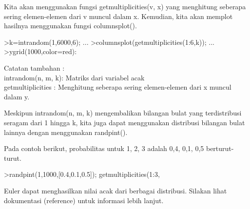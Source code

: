 \documentclass[12pt,arial,letterpaper]{book}
\begin{document}
\begin{eulercomment}
\begin{eulercomment}
\begin{eulercomment}
\begin{eulercomment}
\begin{eulercomment}
\begin{eulercomment}
\begin{eulercomment}
\begin{eulercomment}
\begin{eulercomment}
\begin{eulercomment}
\begin{eulercomment}
\begin{eulercomment}
\begin{eulercomment}
\begin{eulercomment}
\begin{eulercomment}
\begin{eulercomment}
\begin{eulercomment}
\begin{eulercomment}
\begin{eulercomment}
\begin{eulercomment}
\begin{eulercomment}
\begin{eulercomment}
\begin{eulercomment}
\begin{eulercomment}
\begin{eulercomment}
\begin{eulercomment}
\begin{eulercomment}
\begin{eulercomment}
\begin{eulercomment}
\begin{eulercomment}
\begin{eulercomment}
\begin{eulercomment}
\begin{eulercomment}
Kita akan menggunakan fungsi getmultiplicities(v, x) yang menghitung
seberapa sering elemen-elemen dari v muncul dalam x. Kemudian, kita
akan memplot hasilnya menggunakan fungsi columnsplot().
\end{eulercomment}
\begin{eulerprompt}
>k=intrandom(1,6000,6);  ...
>columnsplot(getmultiplicities(1:6,k));  ...
>ygrid(1000,color=red):
\end{eulerprompt}
\begin{eulercomment}
Catatan tambahan :\\
intrandom(n, m, k): Matriks dari variabel acak\\
getmultiplicities : Menghitung seberapa sering elemen-elemen dari x
muncul dalam y.

Meskipun intrandom(n, m, k) mengembalikan bilangan bulat yang
terdistribusi seragam dari 1 hingga k, kita juga dapat menggunakan
distribusi bilangan bulat lainnya dengan menggunakan randpint().

Pada contoh berikut, probabilitas untuk 1, 2, 3 adalah 0,4, 0,1, 0,5
berturut-turut.
\end{eulercomment}
\begin{eulerprompt}
>randpint(1,1000,[0.4,0.1,0.5]); getmultiplicities(1:3,%
\end{eulerprompt}
\begin{euleroutput}
  [394,  107,  499]
\end{euleroutput}
\begin{eulercomment}
Euler dapat menghasilkan nilai acak dari berbagai distribusi. Silakan
lihat dokumentasi (reference) untuk informasi lebih lanjut.


\end{eulercomment}
\end{eulercomment}
\end{eulercomment}
\end{eulercomment}
\end{eulercomment}
\end{eulercomment}
\end{eulercomment}
\end{eulercomment}
\end{eulercomment}
\end{eulercomment}
\end{eulercomment}
\end{eulercomment}
\end{eulercomment}
\end{eulercomment}
\end{eulercomment}
\end{eulercomment}
\end{eulercomment}
\end{eulercomment}
\end{eulercomment}
\end{eulercomment}
\end{eulercomment}
\end{eulercomment}
\end{eulercomment}
\end{eulercomment}
\end{eulercomment}
\end{eulercomment}
\end{eulercomment}
\end{eulercomment}
\end{eulercomment}
\end{eulercomment}
\end{eulercomment}
\end{eulercomment}
\end{eulercomment}
\end{document}

